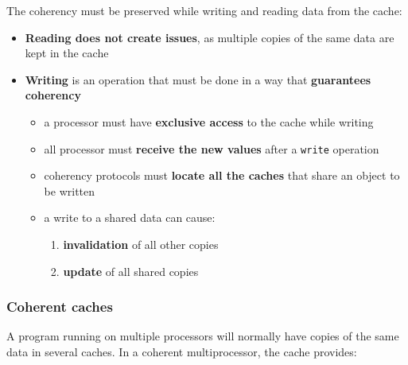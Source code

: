 \documentclass[english]{article}
\begin{document}
\bigskip
The coherency must be preserved while writing and reading data from the cache:

\begin{itemize}
  \item \textbf{Reading does not create issues}, as multiple copies of the same data are kept in the cache
  \item \textbf{Writing} is an operation that must be done in a way that \textbf{guarantees coherency}
        \begin{itemize}
          \item a processor must have \textbf{exclusive access} to the cache while writing
          \item all processor must \textbf{receive the new values} after a \texttt{write} operation
          \item coherency protocols must \textbf{locate all the caches} that share an object to be written
          \item a write to a shared data can cause:
                \begin{enumerate}
                  \item \textbf{invalidation} of all other copies
                  \item \textbf{update} of all shared copies
                \end{enumerate}
        \end{itemize}
\end{itemize}

\subsubsection{Coherent caches}

A program running on multiple processors will normally have copies of the same data in several caches.
In a coherent multiprocessor, the cache provides:
\end{document}
